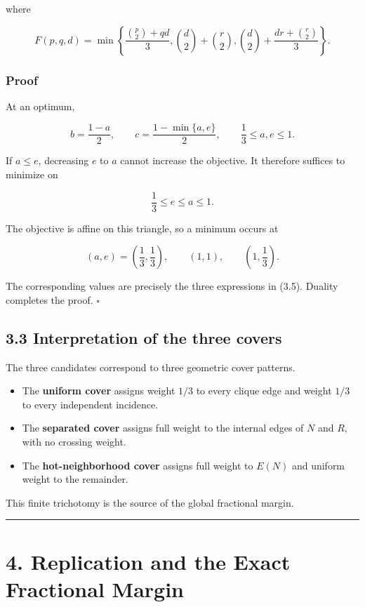 \documentclass[11pt,a4paper]{article}
\providecommand{\tightlist}{\setlength{\itemsep}{0pt}\setlength{\parskip}{0pt}}
\begin{document}
where

\[
\boxed{
F(p,q,d)
=
\min\left\{
\frac{\binom p2+qd}{3},
\binom d2+\binom r2,
\binom d2+\frac{dr+\binom r2}{3}
\right\}.
}
\tag{3.5}
\]

\subsubsection{Proof}\label{proof}

At an optimum,

\[
b=\frac{1-a}{2},
\qquad
c=\frac{1-\min\{a,e\}}2,
\qquad
\frac13\le a,e\le1.
\]

If \(a\le e\), decreasing \(e\) to \(a\) cannot increase the objective. It therefore suffices to minimize on

\[
\frac13\le e\le a\le1.
\]

The objective is affine on this triangle, so a minimum occurs at

\[
(a,e)=\left(\frac13,\frac13\right),
\qquad
(1,1),
\qquad
\left(1,\frac13\right).
\]

The corresponding values are precisely the three expressions in (3.5). Duality completes the proof. \(\square\)

\subsection{3.3 Interpretation of the three covers}\label{interpretation-of-the-three-covers}

The three candidates correspond to three geometric cover patterns.

\begin{itemize}
\tightlist
\item
  The \textbf{uniform cover} assigns weight \(1/3\) to every clique edge and weight \(1/3\) to every independent incidence.
\item
  The \textbf{separated cover} assigns full weight to the internal edges of \(N\) and \(R\), with no crossing weight.
\item
  The \textbf{hot-neighborhood cover} assigns full weight to \(E(N)\) and uniform weight to the remainder.
\end{itemize}

This finite trichotomy is the source of the global fractional margin.

\begin{center}\rule{0.5\linewidth}{0.5pt}\end{center}

\section{4. Replication and the Exact Fractional Margin}\label{replication-and-the-exact-fractional-margin}
\end{document}
